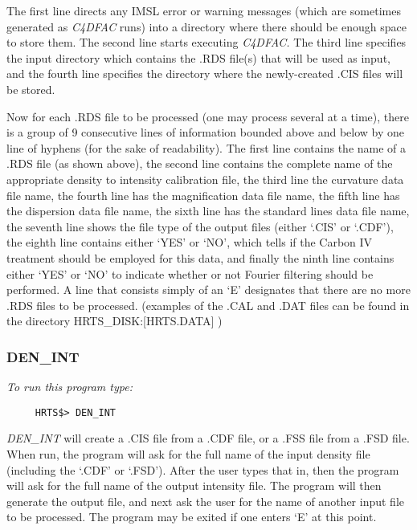       The first line directs any IMSL error or warning messages (which are
   sometimes generated as {\em C4DFAC} runs) into a directory where there should
   be enough space to store them.  The second line starts executing {\em
C4DFAC.}
   The third line specifies the input directory which contains the .RDS
   file(s) that will be used as input, and the fourth line specifies the
   directory where the newly-created .CIS files will be stored.

      Now for each .RDS file to be processed (one may process several at a
   time), there is a group of 9 consecutive lines of information bounded
   above and below by one line of hyphens (for the sake of readability).
   The first line contains the name of a .RDS file (as shown above), the second
   line contains the complete name of the appropriate density to intensity
   calibration file, the third line the curvature data file name, the fourth
   line has the magnification data file name, the fifth line has the
   dispersion data file name, the sixth line has the standard lines data
   file name, the seventh line shows the file type of the output files (either
  `.CIS' or `.CDF'), the eighth line contains either `YES' or `NO', which
   tells if the Carbon IV treatment should be employed for this data, and
   finally the ninth line contains either `YES' or `NO' to indicate whether
   or not Fourier filtering should be performed.  A line that consists
   simply of an `E' designates that there are no more .RDS files to be
   processed. (examples of the .CAL and .DAT files can be found in the
   directory HRTS\_DISK:[HRTS.DATA] )

\subsubsection{DEN\_INT}

{\em To run this program type:}
\begin{verbatim}
     HRTS$> DEN_INT
\end{verbatim}
{\em DEN\_INT} will create a .CIS file from a .CDF file, or a .FSS file
   from a .FSD file.  When run, the program will ask for the full name of
   the input density file (including the `.CDF' or `.FSD').  After the
   user types that in, then the program will ask for the full name of the
   output intensity file.  The program will then generate the output file,
   and next ask the user for the name of another input file to be
   processed.  The program may be exited if one enters `E' at this point.

